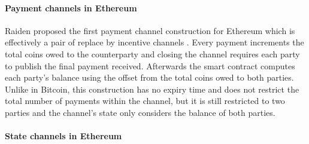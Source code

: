 \documentclass{llncs}
\begin{document}
	\paragraph{Payment channels in Ethereum}
	Raiden proposed the first payment channel construction for Ethereum which is effectively a pair of replace by incentive channels \cite{raidenCode}. 
	Every payment increments the total coins owed to the counterparty and closing the channel requires each party to publish the final payment received. 
	Afterwards the smart contract computes each party's balance using the offset from the total coins owed to both parties. 
	Unlike in Bitcoin, this construction has no expiry time and does not restrict the total number of payments within the channel, but it is still restricted to two parties and the channel's state only considers the balance of both parties. 
	
	\paragraph{State channels in Ethereum} 
	
\end{document}
